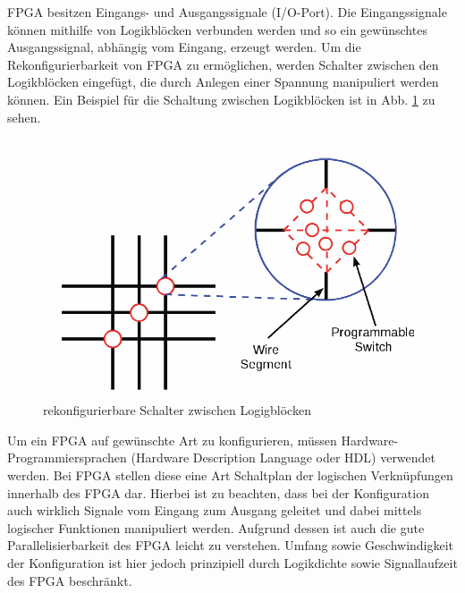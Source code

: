 FPGA besitzen Eingangs- und Ausgangssignale (I/O-Port).
Die Eingangssignale können mithilfe von Logikblöcken verbunden werden und so ein gewünschtes Ausgangssignal, abhängig vom Eingang, erzeugt werden.
Um die Rekonfigurierbarkeit von FPGA zu ermöglichen, werden \glqq Schalter\grqq{} zwischen den Logikblöcken eingefügt, die durch Anlegen einer Spannung manipuliert werden können.
Ein Beispiel für die Schaltung zwischen Logikblöcken ist in Abb. \ref{schalter} zu sehen.
\begin{figure}[h]
  \includegraphics[width=\linewidth]{../Daten/schalter.png}
  \caption{rekonfigurierbare Schalter zwischen Logigblöcken}
  \label{schalter}
\end{figure}
Um ein FPGA auf gewünschte Art zu konfigurieren, müssen Hardware-Programmiersprachen (\glqq Hardware Description Language\grqq{} oder HDL) verwendet werden.
Bei FPGA stellen diese eine Art \glqq Schaltplan\grqq{} der logischen Verknüpfungen innerhalb des FPGA dar.
Hierbei ist zu beachten, dass bei der Konfiguration auch wirklich Signale vom Eingang zum Ausgang geleitet und dabei mittels logischer Funktionen manipuliert werden.
Aufgrund dessen ist auch die gute Parallelisierbarkeit des FPGA leicht zu verstehen.
Umfang sowie Geschwindigkeit der Konfiguration ist hier jedoch prinzipiell durch Logikdichte sowie Signallaufzeit des FPGA beschränkt.

